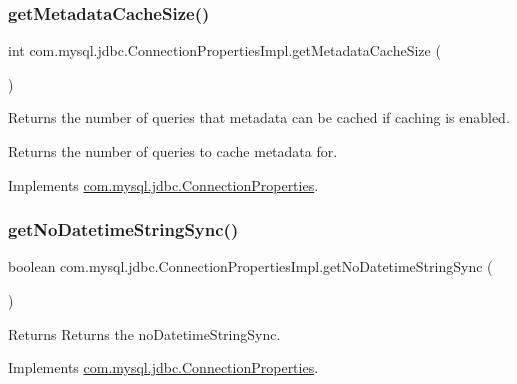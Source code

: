 \subsubsection{\texorpdfstring{get\+Metadata\+Cache\+Size()}{getMetadataCacheSize()}}
{\footnotesize\ttfamily int com.\+mysql.\+jdbc.\+Connection\+Properties\+Impl.\+get\+Metadata\+Cache\+Size (\begin{DoxyParamCaption}{ }\end{DoxyParamCaption})}

Returns the number of queries that metadata can be cached if caching is enabled.

\begin{DoxyReturn}{Returns}
the number of queries to cache metadata for. 
\end{DoxyReturn}


Implements \mbox{\hyperlink{interfacecom_1_1mysql_1_1jdbc_1_1_connection_properties_a980b503e0c8bf4b37a666526770ad043}{com.\+mysql.\+jdbc.\+Connection\+Properties}}.

\mbox{\label{classcom_1_1mysql_1_1jdbc_1_1_connection_properties_impl_a3ed9fdc9cce4d4af314bd168fefa4224}} 
\subsubsection{\texorpdfstring{get\+No\+Datetime\+String\+Sync()}{getNoDatetimeStringSync()}}
{\footnotesize\ttfamily boolean com.\+mysql.\+jdbc.\+Connection\+Properties\+Impl.\+get\+No\+Datetime\+String\+Sync (\begin{DoxyParamCaption}{ }\end{DoxyParamCaption})}

\begin{DoxyReturn}{Returns}
Returns the no\+Datetime\+String\+Sync. 
\end{DoxyReturn}


Implements \mbox{\hyperlink{interfacecom_1_1mysql_1_1jdbc_1_1_connection_properties_aa2bc32d658c0dbe027280d159da5dd49}{com.\+mysql.\+jdbc.\+Connection\+Properties}}.


